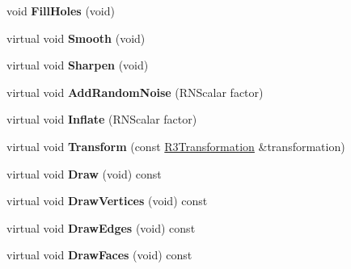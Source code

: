 \begin{DoxyCompactItemize}
\item 
void {\bfseries Fill\+Holes} (void)\hypertarget{class_r3_mesh_a1dd2bed7e7f1f35dc92da3c44f209572}{}\label{class_r3_mesh_a1dd2bed7e7f1f35dc92da3c44f209572}

\item 
virtual void {\bfseries Smooth} (void)\hypertarget{class_r3_mesh_a02a89c8fd4134616d76a9c415f100d94}{}\label{class_r3_mesh_a02a89c8fd4134616d76a9c415f100d94}

\item 
virtual void {\bfseries Sharpen} (void)\hypertarget{class_r3_mesh_a0236954852ec77168c1d5b441c84e6af}{}\label{class_r3_mesh_a0236954852ec77168c1d5b441c84e6af}

\item 
virtual void {\bfseries Add\+Random\+Noise} (R\+N\+Scalar factor)\hypertarget{class_r3_mesh_a3a8033db2236a363793e2f3aca27fa53}{}\label{class_r3_mesh_a3a8033db2236a363793e2f3aca27fa53}

\item 
virtual void {\bfseries Inflate} (R\+N\+Scalar factor)\hypertarget{class_r3_mesh_ad96694ffb2eec64e12594ffff6431d31}{}\label{class_r3_mesh_ad96694ffb2eec64e12594ffff6431d31}

\item 
virtual void {\bfseries Transform} (const \hyperlink{class_r3_transformation}{R3\+Transformation} \&transformation)\hypertarget{class_r3_mesh_a95a7254bad5a9df953b5a7c83e33c819}{}\label{class_r3_mesh_a95a7254bad5a9df953b5a7c83e33c819}

\item 
virtual void {\bfseries Draw} (void) const \hypertarget{class_r3_mesh_a461c7ab5531ca7d6e65ec4ad75e0ec29}{}\label{class_r3_mesh_a461c7ab5531ca7d6e65ec4ad75e0ec29}

\item 
virtual void {\bfseries Draw\+Vertices} (void) const \hypertarget{class_r3_mesh_aab2d488db6f29da36ab833eb85c2e988}{}\label{class_r3_mesh_aab2d488db6f29da36ab833eb85c2e988}

\item 
virtual void {\bfseries Draw\+Edges} (void) const \hypertarget{class_r3_mesh_a894523931224985a5fcd9848c922f47b}{}\label{class_r3_mesh_a894523931224985a5fcd9848c922f47b}

\item 
virtual void {\bfseries Draw\+Faces} (void) const \hypertarget{class_r3_mesh_a18deff9ec010c842c8b55d2f272fbc4b}{}\label{class_r3_mesh_a18deff9ec010c842c8b55d2f272fbc4b}


\end{DoxyCompactItemize}
